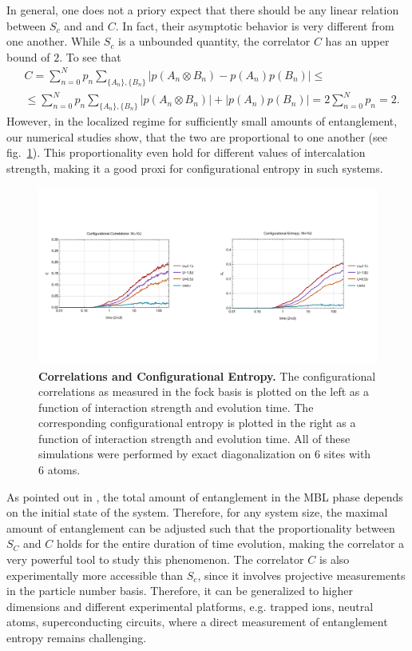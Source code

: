 In general, one does not a priory expect that there should be any linear relation between $S_c$ and and $C$. In fact, their asymptotic behavior is very different from one another. While $S_c$ is a unbounded quantity, the correlator $C$ has an upper bound of $2$. To see that
\begin{equation}
\begin{aligned}
&C = \sum_{n=0}^{N}p_n \sum_{\{A_{n}\},\{B_{n}\}}\left| p(A_{n} \otimes B_{n}) - p(A_{n}) p(B_{n}) \right| \leq \\
&\leq  \sum_{n=0}^{N}p_n \sum_{\{A_{n}\},\{B_{n}\}}\left| p(A_{n} \otimes B_{n})\right| + \left| p(A_{n}) p(B_{n}) \right|  = 2 \sum_{n=0}^{N}p_n  = 2.
\end{aligned}
\end{equation}
However, in the localized regime for sufficiently small amounts of entanglement, our numerical studies show, that the two are proportional to one another (see fig.~\ref{fig:MBL_c_Sc}). This proportionality even hold for different values of intercalation strength, making it a good proxi for configurational entropy in such systems.
\begin{figure}[t]
	\centering
	\includegraphics[width=140mm]{figures/MBL_C_SC.pdf}
	\caption{\label{fig:MBL_c_Sc} \textbf{Correlations and Configurational Entropy.} The configurational correlations  as measured in the fock basis is plotted on the left as a function of interaction strength and evolution time. The corresponding configurational entropy is plotted in the right as a function of interaction strength and evolution time.  All of these simulations were performed by exact diagonalization on 6 sites with 6 atoms.}
\end{figure}

As pointed out in \cite{huse saturated value of entanglement}, the total amount of entanglement in the MBL phase depends on the initial state of the system. Therefore, for any system size, the maximal amount of entanglement can be adjusted such that the proportionality between $S_C$ and $C$ holds for the entire duration of time evolution, making the correlator a very powerful tool to study this phenomenon. The correlator $C$ is also experimentally more accessible than $S_c$, since it involves projective measurements in the particle number basis. Therefore, it can be generalized to higher dimensions and different experimental platforms, e.g. trapped ions, neutral atoms, superconducting circuits, where a direct measurement of entanglement entropy remains challenging.


